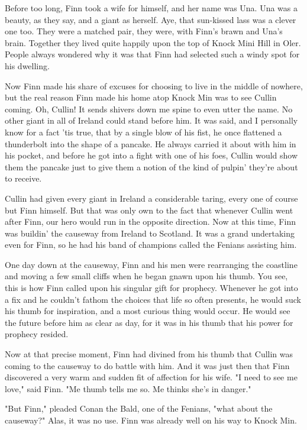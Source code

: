 Before too long, Finn took a wife for himself, and her name was Una. Una was a beauty, as they say, and a giant as herself. Aye, that sun-kissed lass was a clever one too. They were a matched pair, they were, with Finn's brawn and Una's brain. Together they lived quite happily upon the top of Knock Mini Hill in Oler. People always wondered why it was that Finn had selected such a windy spot for his dwelling.

Now Finn made his share of excuses for choosing to live in the middle of nowhere, but the real reason Finn made his home atop Knock Min was to see Cullin coming. Oh, Cullin! It sends shivers down me spine to even utter the name. No other giant in all of Ireland could stand before him. It was said, and I personally know for a fact 'tis true, that by a single blow of his fist, he once flattened a thunderbolt into the shape of a pancake. He always carried it about with him in his pocket, and before he got into a fight with one of his foes, Cullin would show them the pancake just to give them a notion of the kind of pulpin' they're about to receive.

Cullin had given every giant in Ireland a considerable taring, every one of course but Finn himself. But that was only own to the fact that whenever Cullin went after Finn, our hero would run in the opposite direction. Now at this time, Finn was buildin' the causeway from Ireland to Scotland. It was a grand undertaking even for Finn, so he had his band of champions called the Fenians assisting him.

One day down at the causeway, Finn and his men were rearranging the coastline and moving a few small cliffs when he began gnawn upon his thumb. You see, this is how Finn called upon his singular gift for prophecy. Whenever he got into a fix and he couldn't fathom the choices that life so often presents, he would suck his thumb for inspiration, and a most curious thing would occur. He would see the future before him as clear as day, for it was in his thumb that his power for prophecy resided.

Now at that precise moment, Finn had divined from his thumb that Cullin was coming to the causeway to do battle with him. And it was just then that Finn discovered a very warm and sudden fit of affection for his wife. "I need to see me love," said Finn. "Me thumb tells me so. Me thinks she's in danger."

"But Finn," pleaded Conan the Bald, one of the Fenians, "what about the causeway?" Alas, it was no use. Finn was already well on his way to Knock Min.

